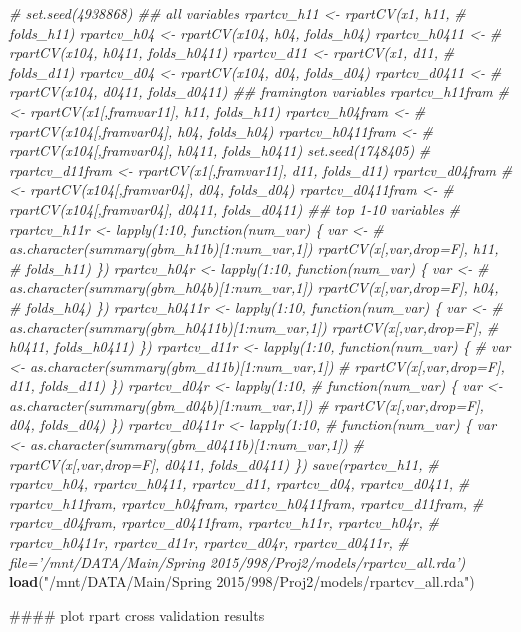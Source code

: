 \documentclass[11pt,]{article}
\newenvironment{Shaded}{\begin{snugshade}}{\end{snugshade}}
\newcommand{\KeywordTok}[1]{\textcolor[rgb]{0.13,0.29,0.53}{\textbf{{#1}}}}
\newcommand{\StringTok}[1]{\textcolor[rgb]{0.31,0.60,0.02}{{#1}}}
\newcommand{\CommentTok}[1]{\textcolor[rgb]{0.56,0.35,0.01}{\textit{{#1}}}}
\newcommand{\NormalTok}[1]{{#1}}
\begin{document}
\begin{Shaded}
\begin{Highlighting}[]
{\CommentTok{# set.seed(4938868) ## all variables rpartcv_h11 <- rpartCV(x1, h11,}
\CommentTok{# folds_h11) rpartcv_h04 <- rpartCV(x104, h04, folds_h04) rpartcv_h0411 <-}
\CommentTok{# rpartCV(x104, h0411, folds_h0411) rpartcv_d11 <- rpartCV(x1, d11,}
\CommentTok{# folds_d11) rpartcv_d04 <- rpartCV(x104, d04, folds_d04) rpartcv_d0411 <-}
\CommentTok{# rpartCV(x104, d0411, folds_d0411) ## framington variables rpartcv_h11fram}
\CommentTok{# <- rpartCV(x1[,framvar11], h11, folds_h11) rpartcv_h04fram <-}
\CommentTok{# rpartCV(x104[,framvar04], h04, folds_h04) rpartcv_h0411fram <-}
\CommentTok{# rpartCV(x104[,framvar04], h0411, folds_h0411) set.seed(1748405)}
\CommentTok{# rpartcv_d11fram <- rpartCV(x1[,framvar11], d11, folds_d11) rpartcv_d04fram}
\CommentTok{# <- rpartCV(x104[,framvar04], d04, folds_d04) rpartcv_d0411fram <-}
\CommentTok{# rpartCV(x104[,framvar04], d0411, folds_d0411) ## top 1-10 variables}
\CommentTok{# rpartcv_h11r <- lapply(1:10, function(num_var) \{ var <-}
\CommentTok{# as.character(summary(gbm_h11b)[1:num_var,1]) rpartCV(x[,var,drop=F], h11,}
\CommentTok{# folds_h11) \}) rpartcv_h04r <- lapply(1:10, function(num_var) \{ var <-}
\CommentTok{# as.character(summary(gbm_h04b)[1:num_var,1]) rpartCV(x[,var,drop=F], h04,}
\CommentTok{# folds_h04) \}) rpartcv_h0411r <- lapply(1:10, function(num_var) \{ var <-}
\CommentTok{# as.character(summary(gbm_h0411b)[1:num_var,1]) rpartCV(x[,var,drop=F],}
\CommentTok{# h0411, folds_h0411) \}) rpartcv_d11r <- lapply(1:10, function(num_var) \{}
\CommentTok{# var <- as.character(summary(gbm_d11b)[1:num_var,1])}
\CommentTok{# rpartCV(x[,var,drop=F], d11, folds_d11) \}) rpartcv_d04r <- lapply(1:10,}
\CommentTok{# function(num_var) \{ var <- as.character(summary(gbm_d04b)[1:num_var,1])}
\CommentTok{# rpartCV(x[,var,drop=F], d04, folds_d04) \}) rpartcv_d0411r <- lapply(1:10,}
\CommentTok{# function(num_var) \{ var <- as.character(summary(gbm_d0411b)[1:num_var,1])}
\CommentTok{# rpartCV(x[,var,drop=F], d0411, folds_d0411) \}) save(rpartcv_h11,}
\CommentTok{# rpartcv_h04, rpartcv_h0411, rpartcv_d11, rpartcv_d04, rpartcv_d0411,}
\CommentTok{# rpartcv_h11fram, rpartcv_h04fram, rpartcv_h0411fram, rpartcv_d11fram,}
\CommentTok{# rpartcv_d04fram, rpartcv_d0411fram, rpartcv_h11r, rpartcv_h04r,}
\CommentTok{# rpartcv_h0411r, rpartcv_d11r, rpartcv_d04r, rpartcv_d0411r,}
\CommentTok{# file='/mnt/DATA/Main/Spring 2015/998/Proj2/models/rpartcv_all.rda')}
\KeywordTok{load}\NormalTok{(}\StringTok{"/mnt/DATA/Main/Spring 2015/998/Proj2/models/rpartcv_all.rda"}\NormalTok{)}


\NormalTok{#### plot rpart cross validation results}

}
\end{Highlighting}
\end{Shaded}
\end{document}
